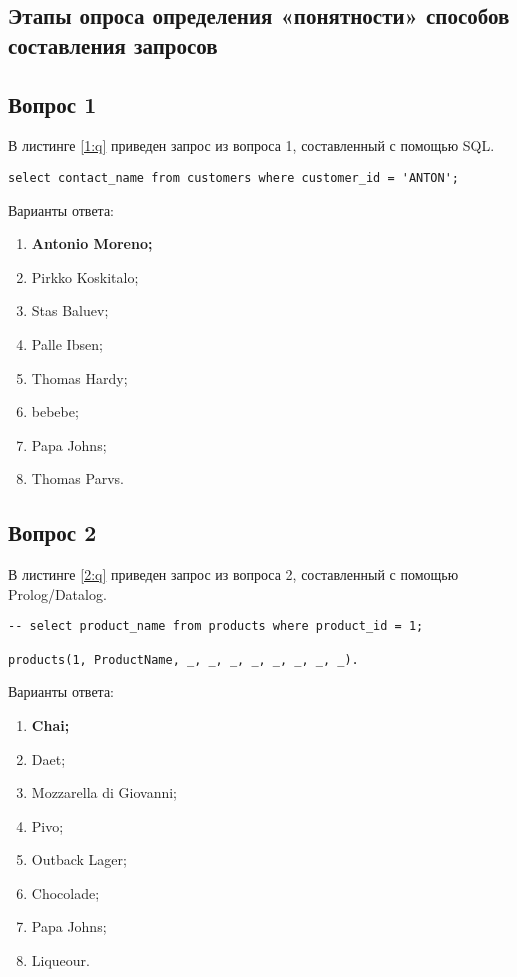 \begin{appendices}

\chapter{Этапы опроса определения «понятности» способов составления запросов}

\section{Вопрос 1}

В листинге \ref{1:q} приведен запрос из вопроса 1, составленный с помощью SQL.

\begin{lstlisting}[label=1:q,caption=Вопрос 1]
select contact_name from customers where customer_id = 'ANTON';
\end{lstlisting}

Варианты ответа:

\begin{enumerate}
	\item \textbf{Antonio Moreno;}
	\item Pirkko Koskitalo;
	\item Stas Baluev;
	\item Palle Ibsen;
	\item Thomas Hardy;
	\item bebebe;
	\item Papa Johns;
	\item Thomas Parvs.
\end{enumerate}

\section{Вопрос 2}

В листинге \ref{2:q} приведен запрос из вопроса 2, составленный с помощью Prolog/Datalog.

\begin{lstlisting}[label=2:q,caption=Вопрос 2]
-- select product_name from products where product_id = 1;

products(1, ProductName, _, _, _, _, _, _, _, _).
\end{lstlisting}

Варианты ответа:

\begin{enumerate}
	\item \textbf{Chai;}
	\item Daet;
	\item Mozzarella di Giovanni;
	\item Pivo;
	\item Outback Lager;
	\item Chocolade;
	\item Papa Johns;
	\item Liqueour.
\end{enumerate}


\end{appendices}
